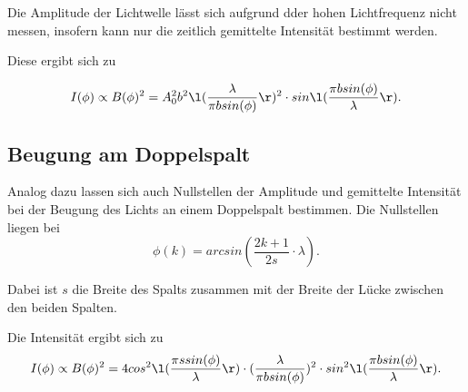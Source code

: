 Die Amplitude der Lichtwelle lässt sich aufgrund dder hohen Lichtfrequenz nicht messen, insofern kann nur die zeitlich gemittelte Intensität bestimmt werden. 

Diese ergibt sich zu 

\begin{equation}
    I(\phi) \propto B(\phi)^2 = A^{2}_0 b^2 \l(\frac{\lambda}{\pi b sin(\phi)} \r)^2 \cdot sin \l(\frac{\pi b sin(\phi)}{\lambda}\r).
    \label{eqn:intensität}
\end{equation}

\subsection{Beugung am Doppelspalt}

Analog dazu lassen sich auch Nullstellen der Amplitude und gemittelte Intensität bei der Beugung des Lichts an einem Doppelspalt bestimmen. 
Die Nullstellen liegen bei 
\begin{equation}
    \phi(k) = arcsin(\frac{2k+1}{2s}\cdot \lambda).
    \label{eqn:doppelns}
\end{equation}

Dabei ist $s$ die Breite des Spalts zusammen mit der Breite der Lücke zwischen den beiden Spalten. 

Die Intensität ergibt sich zu 
\begin{equation}
    I(\phi) \propto B(\phi)^2 =4 cos^2\l(\frac{\pi s sin(\phi)}{\lambda} \r)\cdot(\frac{\lambda}{\pi b sin(\phi)})^2 \cdot sin^2 \l(\frac{\pi b sin(\phi)}{\lambda}\r).
    \label{eqn:doppelintensität}
\end{equation}


